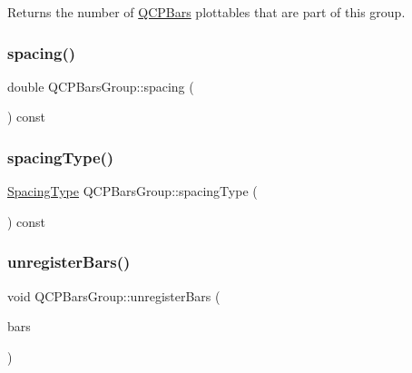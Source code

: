 Returns the number of \mbox{\hyperlink{class_q_c_p_bars}{Q\+C\+P\+Bars}} plottables that are part of this group. \mbox{\label{class_q_c_p_bars_group_a314d09aeb2ad209518b9183ca7ffe662}} 
\subsubsection{\texorpdfstring{spacing()}{spacing()}}
{\footnotesize\ttfamily double Q\+C\+P\+Bars\+Group\+::spacing (\begin{DoxyParamCaption}{ }\end{DoxyParamCaption}) const\hspace{0.3cm}{\ttfamily [inline]}}

\mbox{\label{class_q_c_p_bars_group_a894a77c45325aad2e742d936bc1f8aea}} 
\subsubsection{\texorpdfstring{spacingType()}{spacingType()}}
{\footnotesize\ttfamily \mbox{\hyperlink{class_q_c_p_bars_group_a4c0521120a97e60bbca37677a37075b6}{Spacing\+Type}} Q\+C\+P\+Bars\+Group\+::spacing\+Type (\begin{DoxyParamCaption}{ }\end{DoxyParamCaption}) const\hspace{0.3cm}{\ttfamily [inline]}}

\mbox{\label{class_q_c_p_bars_group_ac7073cdd7b1a40c6cb4b5f908145f8c4}} 
\subsubsection{\texorpdfstring{unregisterBars()}{unregisterBars()}}
{\footnotesize\ttfamily void Q\+C\+P\+Bars\+Group\+::unregister\+Bars (\begin{DoxyParamCaption}\item[{\mbox{\hyperlink{class_q_c_p_bars}{Q\+C\+P\+Bars}} $\ast$}]{bars }\end{DoxyParamCaption})\hspace{0.3cm}{\ttfamily [protected]}}



